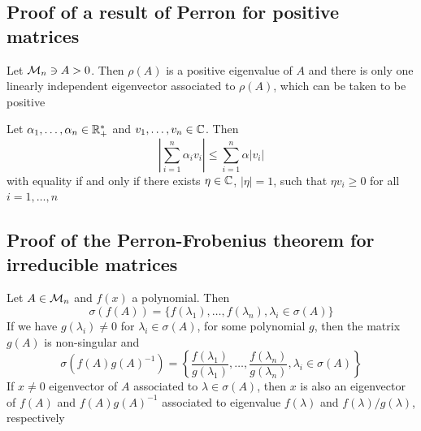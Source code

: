 \documentclass[aspectratio=169]{beamer}
\begin{document}
\subsection{Proof of a result of Perron for positive matrices}
\label{sec:proof_Perron}

\begin{frame}
\begin{lemma}[Perron]\label{lemma:Perron}
Let $\mathcal{M}_n\ni A>0$. Then $\rho(A)$ is a positive eigenvalue of $A$ and there is only one linearly independent eigenvector associated to $\rho(A)$, which can be taken to be positive
\end{lemma}
\vfill
\begin{lemma}\label{lemma:prep_Perron}
Let $\alpha_1,\ldots,\alpha_n\in\mathbb{R}^{*}_{+}$ and $v_1,\ldots,v_n\in\mathbb{C}$. Then
\begin{equation}\label{ineq:proof_Perron_1}
\left|\sum\limits_{i=1}^{n} \alpha_i v_i\right| 
\leq 
\sum\limits_{i=1}^n \alpha |v_i|
\end{equation}
with equality if and only if there exists $\eta\in\mathbb{C}$, $|\eta|=1$, such that $\eta v_i\geq 0$ for all $i=1, \ldots, n$
\end{lemma}
\end{frame}

\subsection{Proof of the Perron-Frobenius theorem for irreducible matrices}
\label{sec:proof_PF}


\begin{frame}
\begin{theorem}\label{CoolTh1}
Let $A\in \mathcal{M}_{n}$ and $f(x)$ a polynomial. Then 
\[
\sigma(f(A))= \{ f(\lambda_1), \ldots, f(\lambda_n), \lambda_i\in \sigma(A)\}
\]
If we have $g(\lambda_i)\neq 0$ for $\lambda_i\in \sigma(A)$, for some polynomial $g$, then the matrix $g(A)$ is non-singular and 
\[
\sigma\left(f(A)g(A)^{-1}\right)
= 
\left\lbrace \dfrac{f(\lambda_1)}{g(\lambda_1)},\ldots, \dfrac{f(\lambda_n)}{g(\lambda_n)}, \lambda_i\in \sigma(A) \right\rbrace
\]
If $x\neq 0$ eigenvector of $A$ associated to $\lambda\in \sigma(A)$, then $x$ is also an eigenvector of $f(A)$ and $f(A)g(A)^{-1}$ associated to eigenvalue $f(\lambda)$ and $f(\lambda)/g(\lambda)$, respectively
\end{theorem}
\end{frame}
\end{document}
